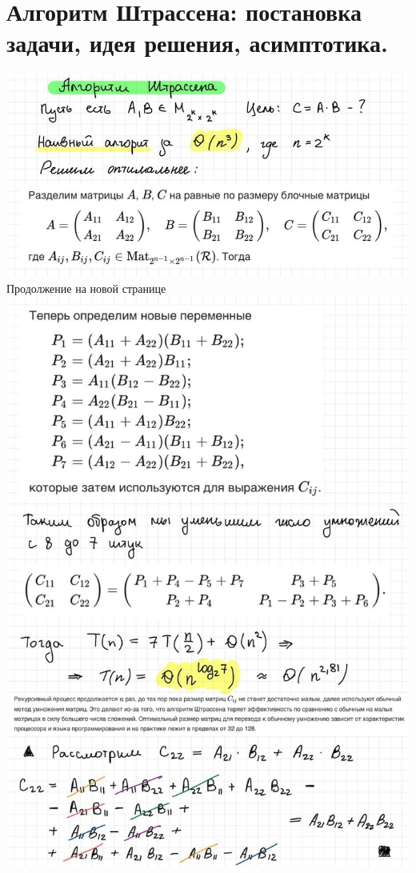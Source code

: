 \section{Алгоритм Штрассена: постановка задачи, идея решения, асимптотика.}

\includegraphics[width=1\linewidth]{images/Shtrassen1.jpg}
Продолжение на новой странице
\newpage \includegraphics[width=1\linewidth]{images/Shtrassen2.jpg}

